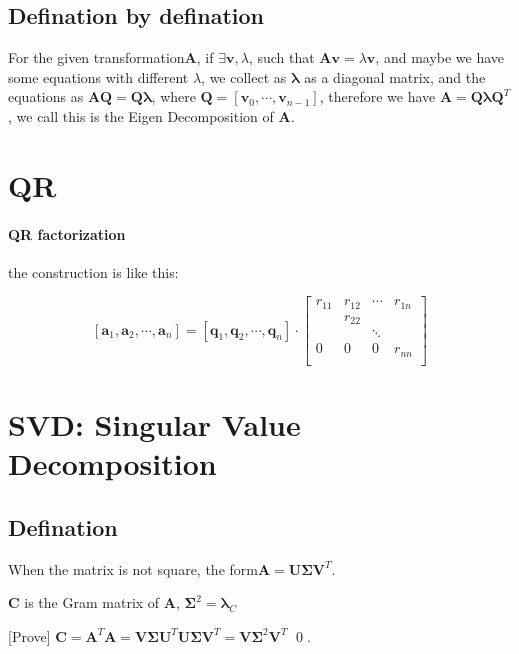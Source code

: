 \documentclass[UTF8]{../../09-Mathematics}
\begin{document}
 
\subsection{Defination by defination}
 
For the given transformation$\boldsymbol A $, if $\exists \boldsymbol v, \lambda$, such that $\boldsymbol A \boldsymbol v = \lambda \boldsymbol v$, and maybe we have some equations with different $\lambda$, we collect as $\boldsymbol  \lambda$ as a diagonal matrix, and the equations as  $\boldsymbol A \boldsymbol Q =  \boldsymbol Q\boldsymbol \lambda$, where $\boldsymbol Q = [\boldsymbol  v_0, \cdots, \boldsymbol  v_{n-1}]$, therefore we have  $\boldsymbol A =  \boldsymbol Q\boldsymbol \lambda\boldsymbol Q ^T$, we call this is the Eigen Decomposition of $\boldsymbol  A$.
 
 


\section{QR}


\paragraph{QR factorization}
the construction is like this:

$$
[\boldsymbol{a}_1,\boldsymbol{a}_2,\cdots, \boldsymbol{a}_n ]
=
[\boldsymbol{q}_1,\boldsymbol{q}_2,\cdots, \boldsymbol{q}_n ]
\cdot 
\begin{bmatrix}
    r_{11} &  r_{12} &\cdots & r_{1n}\\
    &  r_{22} & & \\
    &   &\ddots & \\
    0 & 0 & 0 &r_{nn}  \\
 \end{bmatrix}
$$


\section{SVD: Singular Value Decomposition}


\subsection{Defination}

When the matrix is not square, the form$\boldsymbol  A = \boldsymbol  U  \boldsymbol \Sigma \boldsymbol V^T$.

\begin{lemma}
    $\boldsymbol  C$ is the  Gram matrix of $\boldsymbol  A$, $  \boldsymbol\Sigma^2 = \boldsymbol \lambda_C $

    [Prove] $\boldsymbol  C = \boldsymbol  A^T \boldsymbol  A =
    \boldsymbol  V  \boldsymbol \Sigma \boldsymbol U^T
    \boldsymbol  U  \boldsymbol \Sigma \boldsymbol V^T
    =\boldsymbol  V  \boldsymbol \Sigma^2 \boldsymbol  V^T$ \qed.
\end{lemma}
\end{document}
